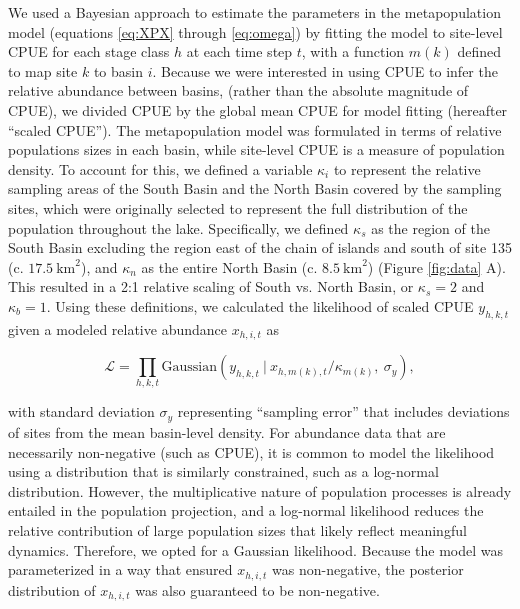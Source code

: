 \documentclass[11pt]{article}
\begin{document}
We used a Bayesian approach to estimate the parameters in the metapopulation model
(equations \ref{eq:XPX} through \ref{eq:omega}) by fitting the model to site-level
CPUE for each stage class $h$ at each time step $t$,
with a function $m(k)$ defined to map site $k$ to basin $i$.
Because we were interested in using CPUE to infer the relative abundance between basins,
(rather than the absolute magnitude of CPUE), 
we divided CPUE by the global mean CPUE for model fitting (hereafter ``scaled CPUE''). 
The metapopulation model was formulated in terms of 
relative populations sizes in each basin,
while site-level CPUE is a measure of population density.
To account for this, we defined a variable $\kappa_i$ to represent the relative 
sampling areas of the South Basin and the North Basin covered by the sampling sites,
which were originally selected to represent the full distribution 
of the population throughout the lake.
Specifically, we defined $\kappa_s$ as the region of the South Basin excluding the region 
east of the chain of islands and south of site 135 (c. $17.5~\textrm{km}^2$),
and $\kappa_n$ as the entire North Basin (c. $8.5~\textrm{km}^2$) (Figure \ref{fig:data} A).
This resulted in a 2:1 relative scaling of South vs. North Basin,
or $\kappa_s = 2$ and $\kappa_b = 1$.
Using these definitions, we calculated the likelihood of scaled CPUE $y_{h,k,t}$
given a modeled relative abundance $x_{h,i,t}$ as
%
\begin{linenomath*}
\begin{equation} \label{eq:likelihood}
\mathcal{L} = 
\displaystyle\prod_{h,k,t}
\textrm{Gaussian}
    \left(
        y_{h,k,t}~|~x_{h,m(k),t} / \kappa_{m(k)},~\sigma_y
    \right),
\end{equation}
\end{linenomath*}
%
with standard deviation $\sigma_y$ representing ``sampling error'' 
that includes deviations of sites from the mean basin-level density.
For abundance data that are necessarily non-negative (such as CPUE), 
it is common to model the likelihood using a distribution that is similarly constrained,
such as a log-normal distribution. 
However, the multiplicative nature of population processes is already entailed 
in the population projection, 
and a log-normal likelihood reduces the relative contribution of large population sizes
that likely reflect meaningful dynamics.
Therefore, we opted for a Gaussian likelihood. 
Because the model was parameterized in a way that ensured
$x_{h,i,t}$ was non-negative,
the posterior distribution of $x_{h,i,t}$ was also guaranteed to be non-negative. 
\end{document}
